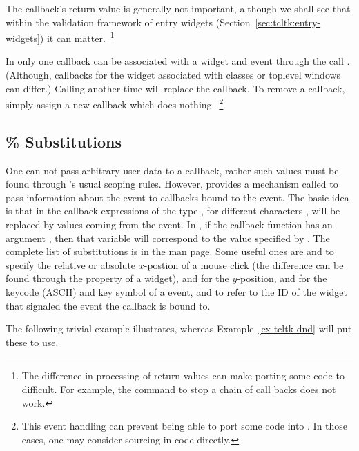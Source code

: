 The callback's return value is generally not important, although we
shall see that within the validation framework of entry widgets
(Section~\ref{sec:tcltk:entry-widgets}) it can matter.~\footnote{The
  difference in processing of return values can make porting some
  \Tk\/ code to  difficult. For example, the 
  command to stop a chain of call backs does not work.}



In  only one callback can be associated with a widget and
event through the call
. (Although, callbacks for the
widget associated with classes or toplevel windows can differ.)
Calling  another time will replace the callback. To
remove a callback, simply assign a new callback which does
nothing.~\footnote{This event handling can prevent being able to port
  some \Tk\/ code into . In those cases, one may consider
  sourcing in \Tcl\/ code directly.}



\subsection{\% Substitutions}
\label{sec:tcltk-percent-substitutions}

One can not pass arbitrary user data to a callback, rather such values
must be found through \R's usual scoping rules. However, \TK\/
provides a mechanism called  to pass
information about the event to callbacks bound to the event. The basic
idea is that in the \TCL\/ callback expressions of the type
, for different characters , will be replaced by values
coming from the event. In , if the callback function has an
argument , then that variable will correspond to the value
specified by . The complete list of substitutions is in the
 man page. Some useful ones are  and  to
specify the relative or absolute $x$-postion of a mouse click (the
difference can be found through the  property of a
widget),  and  for the $y$-position,  and
 for the keycode (ASCII) and key symbol of a
 event, and  to refer to the ID of the
widget that signaled the event the callback is bound
to. 

The following trivial example illustrates, whereas
Example~\ref{ex-tcltk-dnd} will put these to use.

